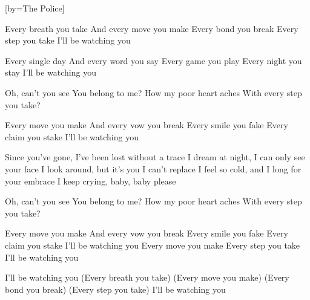[by={The Police}]

  \beginverse
  Every breath you take
  And every move you make
  Every bond you break
  Every step you take
  I'll be watching you
  \endverse

  \beginverse
  Every single day
  And every word you say
  Every game you play
  Every night you stay
  I'll be watching you
  \endverse

  \beginchorus
  Oh, can't you see
  You belong to me?
  How my poor heart aches
  With every step you take?
  \endchorus

  \beginverse
  Every move you make
  And every vow you break
  Every smile you fake
  Every claim you stake
  I'll be watching you
  \endverse

  \beginverse
  Since you've gone, I've been lost without a trace
  I dream at night, I can only see your face
  I look around, but it's you I can't replace
  I feel so cold, and I long for your embrace
  I keep crying, baby, baby please
  \endverse

  \beginchorus
  Oh, can't you see
  You belong to me?
  How my poor heart aches
  With every step you take?
  \endchorus

  \beginverse
  Every move you make
  And every vow you break
  Every smile you fake
  Every claim you stake
  I'll be watching you
  Every move you make
  Every step you take
  I'll be watching you
  \endverse

  \beginverse
  I'll be watching you
  (Every breath you take)
  (Every move you make)
  (Every bond you break)
  (Every step you take) I'll be watching you
  \endverse
\endsong
